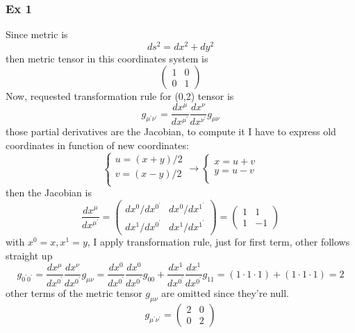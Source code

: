 %
\subsubsection{Ex 1}
Since metric is \[
ds^{2}= dx^{2} +dy^{2}
\]
then metric tensor in this coordinates system is
\[
\begin{pmatrix}
1 & 0 \\
0 & 1
\end{pmatrix} 
\]
Now, requested transformation rule for (0,2) tensor is
\[
g_{\mu ^{\prime }\nu ^{\prime }} = \frac{d x^{\mu }}{d x^{\mu ^{\prime }}} \frac{d x^{\nu }}{d x^{\nu ^{\prime }}} g_{\mu \nu }
\]
those partial derivatives are the Jacobian, to compute it I have to express old coordinates in function of new coordinates:
\[
\begin{cases}
u = \left( x+y \right)/2 \\
v = \left( x-y \right)/2 \\
\end{cases} \to 
\begin{cases}
x = u+v \\
y = u-v \\
\end{cases}
\]
then the Jacobian is 
\[
\frac{d x^{\mu }}{d x^{\mu ^{\prime }}} = \begin{pmatrix}
dx^{0}/dx^{0^{\prime }} & dx^{0}/dx^{1^{\prime }} \\
dx^{1}/dx^{0^{\prime }} & dx^{1}/dx^{1^{\prime }}
\end{pmatrix} = \begin{pmatrix}
1 & 1 \\
1 & -1
\end{pmatrix} 
\]
with $x^{0}=x, x^{1} = y$, I apply transformation rule, just for first term, other follows straight up
\[
g_{0^{\prime }0^{\prime }} = \frac{d x^{\mu }}{d x^{0^{\prime }}}\frac{d x^{\nu }}{d x^{0^{\prime }}} g_{\mu \nu } = \frac{d x^{0}}{d x^{0^{\prime }}}\frac{d x^{0}}{d x^{0^{\prime }}} g_{00} + \frac{d x^{1}}{d x^{0^{\prime }}}\frac{d x^{1}}{d x^{0^{\prime }}} g_{11} = \left( 1\cdot1\cdot1 \right) + \left( 1\cdot1\cdot1 \right) = 2
\]
other terms of the metric tensor $g_{\mu \nu }$ are omitted since they're null. 
\[
g_{\mu ^{\prime }\nu ^{\prime }} = \begin{pmatrix}
2 & 0 \\
0 & 2
\end{pmatrix} 
\]

